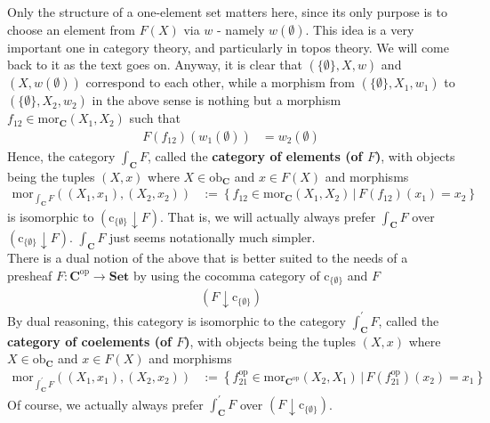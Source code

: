 \begin{enumerate}
Only the structure of a one-element set matters here, since its only purpose is to choose an element from $F(X)$ via $w$ - namely $w(\emptyset)$.
This idea is a very important one in category theory, and particularly in topos theory.
We will come back to it as the text goes on.
Anyway, it is clear that $(\lbrace \emptyset \rbrace,X,w)$ and $(X,w(\emptyset))$ correspond to each other, while a morphism from $(\lbrace \emptyset \rbrace,X_{1},w_{1})$ to $(\lbrace \emptyset \rbrace,X_{2},w_{2})$ in the above sense is nothing but a morphism $f_{12} \in \mathrm{mor}_{\mathbf{C}}(X_{1},X_{2})$ such that
\begin{align*}
  F(f_{12})(w_{1}(\emptyset))
  &=
  w_{2}(\emptyset)
\end{align*}
Hence, the category $\int_{\mathbf{C}}F$, called the \textbf{category of elements (of $F$)}, with objects being the tuples $(X,x)$ where $X \in \mathrm{ob}_{\mathbf{C}}$ and $x \in F(X)$ and morphisms
\begin{align*}
  \mathrm{mor}_{\int_{\mathbf{C}}F}
  \left(
    (X_{1},x_{1}),
    (X_{2},x_{2})
  \right)
  &:=
  \left\lbrace
      f_{12}
      \in
      \mathrm{mor}_{\mathbf{C}}(X_{1},X_{2})
    \,
    \vert
    \,
      F(f_{12})(x_{1})
      =
      x_{2}
  \right\rbrace
\end{align*}
is isomorphic to $(\mathrm{c}_{\lbrace \emptyset \rbrace} \downarrow F)$.
That is, we will actually always prefer $\int_{\mathbf{C}}F$ over $(\mathrm{c}_{\lbrace \emptyset \rbrace} \downarrow F)$.
$\int_{\mathbf{C}}F$ just seems notationally much simpler.
\\
There is a dual notion of the above that is better suited to the needs of a presheaf $F \colon \mathbf{C}^{\mathrm{op}} \rightarrow \mathbf{Set}$ by using the cocomma category of $\mathrm{c}_{\lbrace \emptyset \rbrace}$ and $F$
\begin{align*}
  (F \downarrow \mathrm{c}_{\lbrace \emptyset \rbrace})
\end{align*}
By dual reasoning, this category is isomorphic to the category $\int_{\mathbf{C}}^{\prime}F$, called the \textbf{category of coelements (of $F$)}, with objects being the tuples $(X,x)$ where $X \in \mathrm{ob}_{\mathbf{C}}$ and $x \in F(X)$ and morphisms
\begin{align*}
  \mathrm{mor}_{\int_{\mathbf{C}}^{\prime}F}
  \left(
    (X_{1},x_{1}),
    (X_{2},x_{2})
  \right)
  &:=
  \left\lbrace
      f_{21}^{\mathrm{op}}
      \in
      \mathrm{mor}_{\mathbf{C}^{\mathrm{op}}}(X_{2},X_{1})
    \,
    \vert
    \,
      F(f_{21}^{\mathrm{op}})(x_{2})
      =
      x_{1}
  \right\rbrace
\end{align*}
Of course, we actually always prefer $\int_{\mathbf{C}}^{\prime}F$ over $(F \downarrow \mathrm{c}_{\lbrace \emptyset \rbrace})$.
\end{enumerate}
